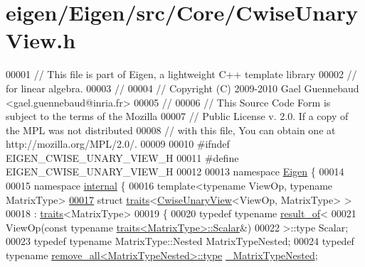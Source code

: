 \hypertarget{eigen_2_eigen_2src_2_core_2_cwise_unary_view_8h_source}{}\section{eigen/\+Eigen/src/\+Core/\+Cwise\+Unary\+View.h}
\label{eigen_2_eigen_2src_2_core_2_cwise_unary_view_8h_source}

\begin{DoxyCode}
00001 \textcolor{comment}{// This file is part of Eigen, a lightweight C++ template library}
00002 \textcolor{comment}{// for linear algebra.}
00003 \textcolor{comment}{//}
00004 \textcolor{comment}{// Copyright (C) 2009-2010 Gael Guennebaud <gael.guennebaud@inria.fr>}
00005 \textcolor{comment}{//}
00006 \textcolor{comment}{// This Source Code Form is subject to the terms of the Mozilla}
00007 \textcolor{comment}{// Public License v. 2.0. If a copy of the MPL was not distributed}
00008 \textcolor{comment}{// with this file, You can obtain one at http://mozilla.org/MPL/2.0/.}
00009 
00010 \textcolor{preprocessor}{#ifndef EIGEN\_CWISE\_UNARY\_VIEW\_H}
00011 \textcolor{preprocessor}{#define EIGEN\_CWISE\_UNARY\_VIEW\_H}
00012 
00013 \textcolor{keyword}{namespace }\hyperlink{namespace_eigen}{Eigen} \{
00014 
00015 \textcolor{keyword}{namespace }\hyperlink{namespaceinternal}{internal} \{
00016 \textcolor{keyword}{template}<\textcolor{keyword}{typename} ViewOp, \textcolor{keyword}{typename} MatrixType>
\hyperlink{struct_eigen_1_1internal_1_1traits_3_01_cwise_unary_view_3_01_view_op_00_01_matrix_type_01_4_01_4}{00017} \textcolor{keyword}{struct }\hyperlink{struct_eigen_1_1internal_1_1traits}{traits}<\hyperlink{group___core___module_class_eigen_1_1_cwise_unary_view}{CwiseUnaryView}<ViewOp, MatrixType> >
00018  : \hyperlink{struct_eigen_1_1internal_1_1traits}{traits}<MatrixType>
00019 \{
00020   \textcolor{keyword}{typedef} \textcolor{keyword}{typename} \hyperlink{struct_eigen_1_1internal_1_1result__of}{result\_of}<
00021                      ViewOp(\textcolor{keyword}{const} \textcolor{keyword}{typename} \hyperlink{struct_eigen_1_1internal_1_1traits}{traits<MatrixType>::Scalar}&)
00022                    >::type Scalar;
00023   \textcolor{keyword}{typedef} \textcolor{keyword}{typename} MatrixType::Nested MatrixTypeNested;
00024   \textcolor{keyword}{typedef} \textcolor{keyword}{typename} \hyperlink{group___sparse_core___module}{remove\_all<MatrixTypeNested>::type} 
      \hyperlink{group___sparse_core___module}{\_MatrixTypeNested};

\end{DoxyCode}
